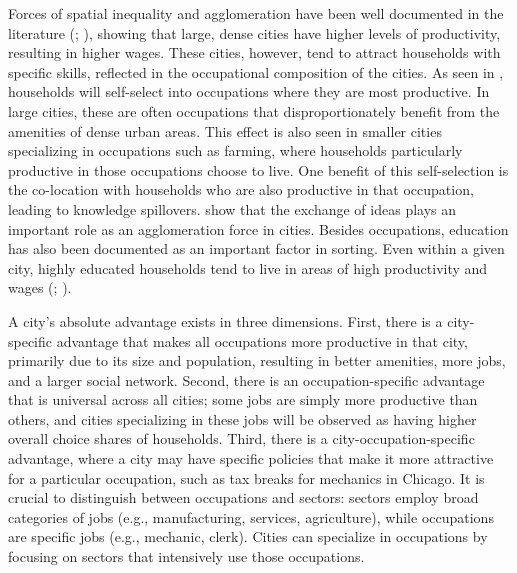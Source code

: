 \documentclass[10pt]{article}
\begin{document}
Forces of spatial inequality and agglomeration have been well documented in the literature (\cite{behrens2014}; \cite{br2015}), showing that large, dense cities have higher levels of productivity, resulting in higher wages. These cities, however, tend to attract households with specific skills, reflected in the occupational composition of the cities. As seen in \cite{lagakos_waugh2013}, households will self-select into occupations where they are most productive. In large cities, these are often occupations that disproportionately benefit from the amenities of dense urban areas. This effect is also seen in smaller cities specializing in occupations such as farming, where households particularly productive in those occupations choose to live. One benefit of this self-selection is the co-location with households who are also productive in that occupation, leading to knowledge spillovers. \cite{dandd} show that the exchange of ideas plays an important role as an agglomeration force in cities. Besides occupations, education has also been documented as an important factor in sorting. Even within a given city, highly educated households tend to live in areas of high productivity and wages (\cite{diamond}; \cite{diamond2022}).

A city's absolute advantage exists in three dimensions. First, there is a city-specific advantage that makes all occupations more productive in that city, primarily due to its size and population, resulting in better amenities, more jobs, and a larger social network. Second, there is an occupation-specific advantage that is universal across all cities; some jobs are simply more productive than others, and cities specializing in these jobs will be observed as having higher overall choice shares of households. Third, there is a city-occupation-specific advantage, where a city may have specific policies that make it more attractive for a particular occupation, such as tax breaks for mechanics in Chicago. It is crucial to distinguish between occupations and sectors: sectors employ broad categories of jobs (e.g., manufacturing, services, agriculture), while occupations are specific jobs (e.g., mechanic, clerk). Cities can specialize in occupations by focusing on sectors that intensively use those occupations.
\end{document}
